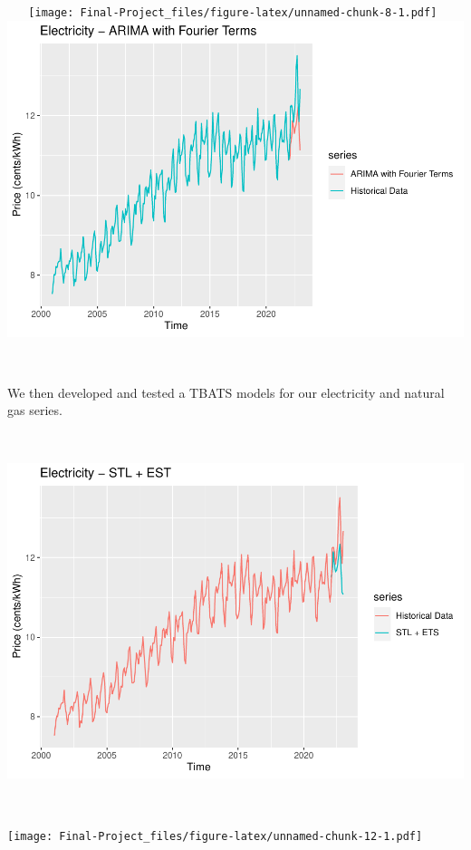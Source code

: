\documentclass[
]{article}
\begin{document}
~ ~
\texttt{[image: Final-Project\_files/figure-latex/unnamed-chunk-8-1.pdf]}
\includegraphics{Final-Project_files/figure-latex/unnamed-chunk-9-1.pdf}

~ ~

We then developed and tested a TBATS models for our electricity and
natural gas series.

~ ~

\includegraphics{Final-Project_files/figure-latex/unnamed-chunk-11-1.pdf}

~ ~

\texttt{[image: Final-Project\_files/figure-latex/unnamed-chunk-12-1.pdf]}
~ ~
\end{document}
